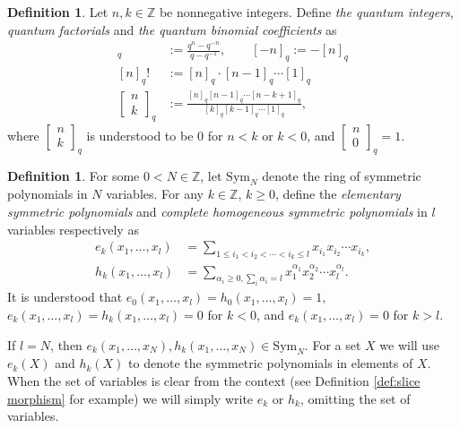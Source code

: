 \documentclass[12pt]{amsart}
\theoremstyle{definition}
\newtheorem{definition}[theorem]{Definition}
\theoremstyle{remark}
\numberwithin{equation}{section}
\numberwithin{figure}{section}
\newcommand{\Z}{\mathbb{Z}}
\newcommand{\Symf}{\mathrm{Sym}_N}
\begin{document}
\begin{definition}
    Let $n,k \in \Z$ be nonnegative integers. Define \emph{the quantum integers}, \emph{quantum factorials} and \emph{the quantum binomial coefficients} as
    \begin{align*}
    [n]_q &:=\frac{q^n-q^{-n}}{q-q^{-1}}, \qquad [-n]_q := - [n]_q \\
    [n]_q! &:= [n]_q \cdot [n-1]_q \cdots [1]_ q \\
            \begin{bmatrix}
    n\\
    k
  \end{bmatrix}_q
  &:=\frac{[n]_q[n-1]_q\cdots [n-k+1]_q}{[k]_q[k-1]_q\cdots[1]_q},
    \end{align*}
where $\begin{bmatrix}
    n\\
    k
  \end{bmatrix}_q$ is understood to be $0$ for $n < k$ or $k < 0$, and $\begin{bmatrix}
    n\\
    0
  \end{bmatrix}_q = 1$.
\end{definition}
\begin{definition}
For some $0 < N \in \Z$, let $\Symf$ denote the ring of symmetric polynomials in $N$ variables. For any $k \in \Z$, $k\geq 0$, define the \emph{elementary symmetric polynomials} and \emph{complete homogeneous symmetric polynomials} in $l$ variables respectively as 
\begin{align*}
    e_k(x_1,  \ldots, x_l) &=\sum_{1\leq i_1<i_2<\cdots<i_k\leq l}x_{i_1}x_{i_2}\cdots x_{i_k}, \\
h_k(x_1,  \ldots, x_l)  &=\sum_{\alpha_i\geq 0,\sum_i \alpha_i=l}x_1^{\alpha_1}x_2^{\alpha_2}\cdots x_l^{\alpha_l}.
\end{align*}
It is understood that $e_0(x_1,  \ldots, x_l) = h_0(x_1,  \ldots, x_l) = 1,$ $e_k(x_1,  \ldots, x_l) = h_k(x_1,  \ldots, x_l)= 0$ for $k<0$, and $e_k(x_1,  \ldots, x_l) = 0$ for $k>l$. 

If $l = N$, then $e_k(x_1,  \ldots, x_N), h_k(x_1,  \ldots, x_N) \in \Symf$. For a set $X$ we will use $e_k(X)$ and $h_k(X)$ to denote the symmetric polynomials in elements of $X$. When the set of variables is clear from the context (see Definition \ref{def:slice morphism} for example) we will simply write $e_k$ or $h_k$, omitting the set of variables. 
\end{definition}
\end{document}
